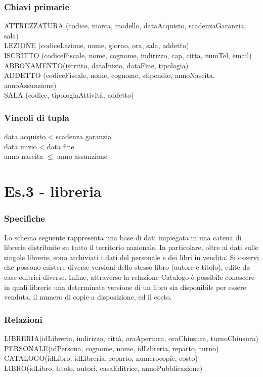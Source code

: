 \subsubsection{Chiavi primarie}
ATTREZZATURA (codice, marca, modello, dataAcquisto, scadenzaGaranzia, sala)
\\LEZIONE (codiceLezione, nome, giorno, ora, sala, addetto)
\\ISCRITTO (codiceFiscale, nome, cognome, indirizzo, cap, citta, numTel, email)
\\ABBONAMENTO(iscritto, dataInizio, dataFine, tipologia)
\\ADDETTO (codiceFiscale, nome, cognome, stipendio, annoNascita, annoAssunzione)
\\SALA (codice, tipologiaAttività, addetto)

\subsubsection{Vincoli di tupla}
data acquisto < scadenza garanzia
\\data inizio < data fine
\\anno nascita $\leq$ anno assunzione 

\section{Es.3 - libreria}
\subsubsection{Specifiche}
Lo schema seguente rappresenta una base di dati impiegata in una catena di librerie distribuite su tutto il territorio nazionale. In particolare, oltre ai dati sulle singole librerie, sono archiviati i dati del personale e dei libri in vendita. Si osservi che possono esistere diverse versioni dello stesso libro (autore e titolo), edite da case editrici diverse. Infine, attraverso la relazione Catalogo è possibile conoscere in quali librerie una determinata versione di un libro sia disponibile per essere venduta, il numero di copie a disposizione, ed il costo. 

\subsubsection{Relazioni}
LIBRERIA(idLibreria, indirizzo, città, oraApertura, oraChiusura, turnoChiusura)
\\PERSONALE(idPersona, cognome, nome, idLibreria, reparto, turno)
\\CATALOGO(idLibro, idLibreria, reparto, numerocopie, costo)
\\LIBRO(idLibro, titolo, autori, casaEditrice, annoPubblicazione)

